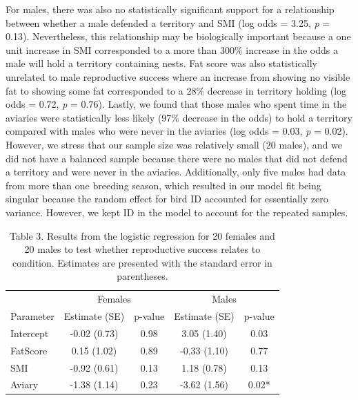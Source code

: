 \documentclass[
]{article}
\begin{document}
For males, there was also no statistically significant support for a
relationship between whether a male defended a territory and SMI (log
odds = 3.25, \emph{p} = 0.13). Nevertheless, this relationship may be
biologically important because a one unit increase in SMI corresponded
to a more than 300\% increase in the odds a male will hold a territory
containing nests. Fat score was also statistically unrelated to male
reproductive success where an increase from showing no visible fat to
showing some fat corresponded to a 28\% decrease in territory holding
(log odds = 0.72, \emph{p} = 0.76). Lastly, we found that those males
who spent time in the aviaries were statistically less likely (97\%
decrease in the odds) to hold a territory compared with males who were
never in the aviaries (log odds = 0.03, \emph{p} = 0.02). However, we
stress that our sample size was relatively small (20 males), and we did
not have a balanced sample because there were no males that did not
defend a territory and were never in the aviaries. Additionally, only
five males had data from more than one breeding season, which resulted
in our model fit being singular because the random effect for bird ID
accounted for essentially zero variance. However, we kept ID in the
model to account for the repeated samples.

\begin{table}

\caption{\label{tab:p2 main results}Table 3. Results from the logistic regression for 20 females and 20 males to test whether reproductive success relates to condition. Estimates are presented with the standard error in parentheses.}
\centering
\begin{tabular}[t]{l|c|c|c|c}
\hline
\multicolumn{1}{c|}{ } & \multicolumn{2}{c|}{Females} & \multicolumn{2}{c}{Males} \\
\cline{2-3} \cline{4-5}
Parameter & Estimate (SE) & p-value & Estimate (SE) & p-value\\
\hline
Intercept & -0.02 (0.73) & 0.98 & 3.05 (1.40) & 0.03\\
\hline
FatScore & 0.15 (1.02) & 0.89 & -0.33 (1.10) & 0.77\\
\hline
SMI & -0.92 (0.61) & 0.13 & 1.18 (0.78) & 0.13\\
\hline
Aviary & -1.38 (1.14) & 0.23 & -3.62 (1.56) & 0.02*\\
\hline
\end{tabular}
\end{table}

\pagebreak
\end{document}
